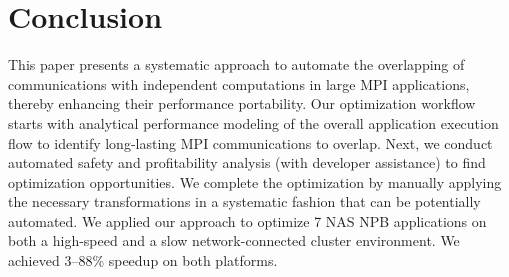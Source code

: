 \section{Conclusion}
\label{sec-concl}

This paper presents a systematic approach to automate the overlapping
of communications with independent computations in large MPI
applications, thereby enhancing their performance portability.  Our
optimization workflow starts with analytical performance modeling of
the overall application execution flow to identify long-lasting MPI
communications to overlap. Next, we conduct automated safety
and profitability analysis (with developer assistance) to find optimization opportunities. We
complete the optimization by manually applying the necessary
transformations in a systematic fashion that can be potentially
automated.  We applied our approach to optimize 7 NAS NPB applications
on both a high-speed and a slow network-connected cluster
environment. We achieved 3--88\% speedup on both platforms.

